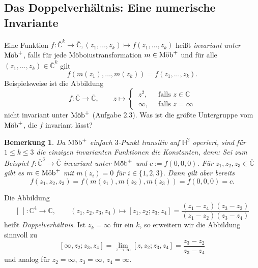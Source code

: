 \documentclass[11pt]{book}
\numberwithin{dummy}{section}
\newtheorem{remark}[theorem]{Bemerkung}
\theoremstyle{nonumberbreak}
\newenvironment{defin}[1][]{\ifthenelse{\equal{#1}{}}{\definition}{\definition[#1]}\rm}{\enddefinition}
\newcommand{\C}{\mathbb{C}}
\newcommand{\He}{\mathbb{H}}
\newcommand{\CC}{\overline{\mathbb{C}}}
\newcommand{\la}{\longrightarrow}
\newcommand{\mob}{\textup{Möb}^+}
\begin{document}
\begin{spacing}{1.4}
\section{Das Doppelverhältnis: Eine numerische Invariante} %



Eine Funktion $f: \CC^k \la \CC, (z_1, \ldots, z_k) \mapsto f(z_1, \ldots, z_k)$ heißt \textit{invariant unter} $\mob$, falls für jede Möboiustransformation $m \in \mob$ und für alle $(z_1, \ldots, z_k) \in \CC^k$ gilt
$$f\left( m(z_1), \ldots, m(z_k)\right) = f(z_1, \ldots, z_k).$$
Beispielsweise ist die Abbildung
$$f: \CC \la \CC, \qquad z \mapsto \begin{cases} \ z^2, & \ \textrm{ falls } z \in \C \\ \ \infty, & \ \textrm{ falls } z = \infty \end{cases}$$
nicht invariant unter $\mob$ (Aufgabe 2.3). Was ist die größte Untergruppe vom $\mob$, die $f$ invariant lässt? 

\begin{remark}
Da $\mob$ einfach $3$-Punkt transitiv auf $\He^2$ operiert, sind für $1 \leqslant k \leqslant 3$ die einzigen invarianten Funktionen die Konstanten, denn: Sei zum Beispiel $f: \CC^3 \la \CC$ invariant unter $\mob$ und $c:=f(0,0,0)$. Für $z_1, z_2, z_3 \in \CC$ gibt es $m \in \mob$ mit $m(z_i)=0$ für $i\in \{1,2,3\}$. Dann gilt aber bereits
$$f(z_1, z_2, z_3)= f(m(z_1), m(z_2), m(z_3)) = f(0,0,0)=c.$$

\end{remark}


\begin{defin}
Die Abbildung 
$$[\ ]: \C^{4} \la \C, \qquad (z_1, z_2, z_3, z_4) \mapsto [z_1, z_2; z_3, z_4] = \frac{(z_1-z_4)(z_3-z_2)}{(z_1-z_2)(z_3-z_4)}$$
heißt \textit{Doppelverhältnis}. Ist $z_k = \infty$ für ein $k$, so erweitern wir die Abbildung sinnvoll zu
$$[\infty, z_2; z_3, z_4] = \lim_{z \to \infty} [z, z_2; z_3, z_4] = \frac{z_3-z_2}{z_3-z_4}$$
und analog für $z_2=\infty$, $z_3= \infty$, $z_4= \infty$. 

\end{defin}



\end{spacing}
\end{document}
